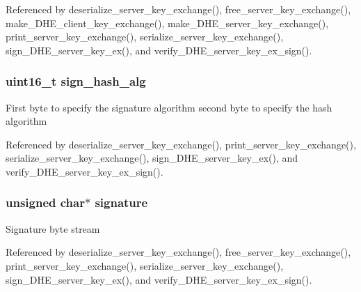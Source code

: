 Referenced by deserialize\+\_\+server\+\_\+key\+\_\+exchange(), free\+\_\+server\+\_\+key\+\_\+exchange(), make\+\_\+\+D\+H\+E\+\_\+client\+\_\+key\+\_\+exchange(), make\+\_\+\+D\+H\+E\+\_\+server\+\_\+key\+\_\+exchange(), print\+\_\+server\+\_\+key\+\_\+exchange(), serialize\+\_\+server\+\_\+key\+\_\+exchange(), sign\+\_\+\+D\+H\+E\+\_\+server\+\_\+key\+\_\+ex(), and verify\+\_\+\+D\+H\+E\+\_\+server\+\_\+key\+\_\+ex\+\_\+sign().

\subsubsection[{\texorpdfstring{sign\+\_\+hash\+\_\+alg}{sign_hash_alg}}]{\setlength{\rightskip}{0pt plus 5cm}uint16\+\_\+t sign\+\_\+hash\+\_\+alg}\hypertarget{structdhe__server__key__exchange__t_a07ea01aadbb81f38a9a27e324d11f54e}{}\label{structdhe__server__key__exchange__t_a07ea01aadbb81f38a9a27e324d11f54e}
First byte to specify the signature algorithm second byte to specify the hash algorithm 

Referenced by deserialize\+\_\+server\+\_\+key\+\_\+exchange(), print\+\_\+server\+\_\+key\+\_\+exchange(), serialize\+\_\+server\+\_\+key\+\_\+exchange(), sign\+\_\+\+D\+H\+E\+\_\+server\+\_\+key\+\_\+ex(), and verify\+\_\+\+D\+H\+E\+\_\+server\+\_\+key\+\_\+ex\+\_\+sign().

\subsubsection[{\texorpdfstring{signature}{signature}}]{\setlength{\rightskip}{0pt plus 5cm}unsigned char$\ast$ signature}\hypertarget{structdhe__server__key__exchange__t_a775505f2a74638cda44fdd79c4e07993}{}\label{structdhe__server__key__exchange__t_a775505f2a74638cda44fdd79c4e07993}
Signature byte stream 

Referenced by deserialize\+\_\+server\+\_\+key\+\_\+exchange(), free\+\_\+server\+\_\+key\+\_\+exchange(), print\+\_\+server\+\_\+key\+\_\+exchange(), serialize\+\_\+server\+\_\+key\+\_\+exchange(), sign\+\_\+\+D\+H\+E\+\_\+server\+\_\+key\+\_\+ex(), and verify\+\_\+\+D\+H\+E\+\_\+server\+\_\+key\+\_\+ex\+\_\+sign().

